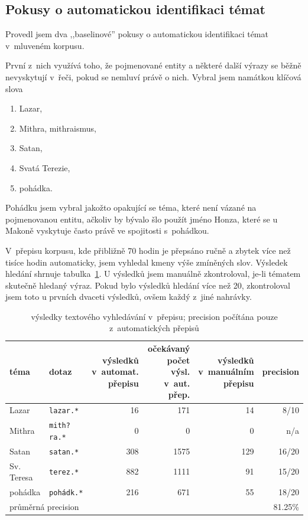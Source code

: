 \subsection{Pokusy o automatickou identifikaci témat}

Provedl jsem dva ,,baselinové'' pokusy o automatickou identifikaci témat
v~mluveném korpusu.

První z~nich využívá toho, že pojmenované entity a některé další výrazy se běžně
nevyskytují v~řeči, pokud se nemluví právě o nich. Vybral jsem namátkou klíčová
slova
\begin{enumerate}
\item{Lazar,}
\item{Mithra, mithraismus,}
\item{Satan,}
\item{Svatá Terezie,}
\item{pohádka.}
\end{enumerate}

Pohádku jsem vybral jakožto opakující se téma, které není vázané na pojmenovanou
entitu, ačkoliv by bývalo šlo použít jméno Honza, které se u Makoně vyskytuje
často právě ve spojitosti s~pohádkou.

V~přepisu korpusu, kde přibližně 70 hodin je
přepsáno ručně a zbytek více než tisíce hodin automaticky, jsem vyhledal kmeny
výše zmíněných slov. Výsledek hledání shrnuje tabulka~\ref{tab:topicsearch}.
U výsledků jsem manuálně zkontroloval, je-li tématem skutečně hledaný výraz.
Pokud bylo výsledků hledání více než 20, zkontroloval jsem toto u prvních
dvaceti výsledků, ovšem každý z~jiné nahrávky.

\begin{table}[htpb]
\begin{center}
\begin{tabular}{|l|l|r|r|r|r|}
\hline
téma &
dotaz &
\makecell{výsledků\\ v~automat.\\ přepisu} &
\makecell{očekávaný\\ počet výsl.\\ v~aut. přep.} &
\makecell{výsledků\\ v~manuálním\\ přepisu} &
precision \\
\hline
Lazar & \texttt{lazar.*} & 16 & 171 & 14 & 8/10   \\
Mithra & \texttt{mith?ra.*} & 0 & 0 & 0 & n/a   \\
Satan & \texttt{satan.*} & 308 & 1575 & 129 & 16/20   \\
Sv. Teresa & \texttt{terez.*} & 882 & 1111 & 91 & 15/20   \\
pohádka & \texttt{pohádk.*} & 216 & 671 & 55 & 18/20   \\
\hline
\multicolumn{5}{|l|}{průměrná precision} & 81.25\%\\
\hline
\end{tabular}
\caption{výsledky textového vyhledávání v~přepisu; precision počítána pouze
z~automatických přepisů}\label{tab:topicsearch}
\end{center}
\end{table}

